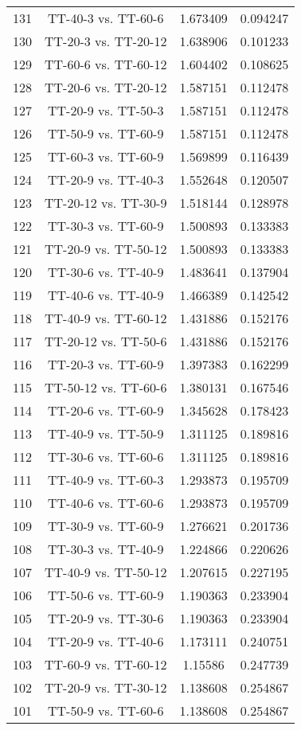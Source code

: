\documentclass[a4paper,10pt]{article}
\begin{document}
\begin{landscape}
\begin{table}[!htp]
\begin{tabular}{cccc}
131&TT-40-3 vs. TT-60-6&1.673409&0.094247\\
130&TT-20-3 vs. TT-20-12&1.638906&0.101233\\
129&TT-60-6 vs. TT-60-12&1.604402&0.108625\\
128&TT-20-6 vs. TT-20-12&1.587151&0.112478\\
127&TT-20-9 vs. TT-50-3&1.587151&0.112478\\
126&TT-50-9 vs. TT-60-9&1.587151&0.112478\\
125&TT-60-3 vs. TT-60-9&1.569899&0.116439\\
124&TT-20-9 vs. TT-40-3&1.552648&0.120507\\
123&TT-20-12 vs. TT-30-9&1.518144&0.128978\\
122&TT-30-3 vs. TT-60-9&1.500893&0.133383\\
121&TT-20-9 vs. TT-50-12&1.500893&0.133383\\
120&TT-30-6 vs. TT-40-9&1.483641&0.137904\\
119&TT-40-6 vs. TT-40-9&1.466389&0.142542\\
118&TT-40-9 vs. TT-60-12&1.431886&0.152176\\
117&TT-20-12 vs. TT-50-6&1.431886&0.152176\\
116&TT-20-3 vs. TT-60-9&1.397383&0.162299\\
115&TT-50-12 vs. TT-60-6&1.380131&0.167546\\
114&TT-20-6 vs. TT-60-9&1.345628&0.178423\\
113&TT-40-9 vs. TT-50-9&1.311125&0.189816\\
112&TT-30-6 vs. TT-60-6&1.311125&0.189816\\
111&TT-40-9 vs. TT-60-3&1.293873&0.195709\\
110&TT-40-6 vs. TT-60-6&1.293873&0.195709\\
109&TT-30-9 vs. TT-60-9&1.276621&0.201736\\
108&TT-30-3 vs. TT-40-9&1.224866&0.220626\\
107&TT-40-9 vs. TT-50-12&1.207615&0.227195\\
106&TT-50-6 vs. TT-60-9&1.190363&0.233904\\
105&TT-20-9 vs. TT-30-6&1.190363&0.233904\\
104&TT-20-9 vs. TT-40-6&1.173111&0.240751\\
103&TT-60-9 vs. TT-60-12&1.15586&0.247739\\
102&TT-20-9 vs. TT-30-12&1.138608&0.254867\\
101&TT-50-9 vs. TT-60-6&1.138608&0.254867\\

\end{tabular}
\end{table}
\end{landscape}
\end{document}
